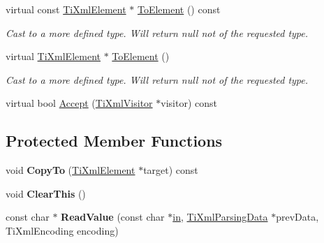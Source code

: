 \begin{DoxyCompactItemize}
\item 
\hypertarget{classTiXmlElement_ac5b8d0e25fa23fd9acbb6d146082901c}{virtual const \hyperlink{classTiXmlElement}{Ti\-Xml\-Element} $\ast$ \hyperlink{classTiXmlElement_ac5b8d0e25fa23fd9acbb6d146082901c}{To\-Element} () const }\label{classTiXmlElement_ac5b8d0e25fa23fd9acbb6d146082901c}

\begin{DoxyCompactList}\small\item\em Cast to a more defined type. Will return null not of the requested type. \end{DoxyCompactList}\item 
\hypertarget{classTiXmlElement_a9def86337ea7a755eb41cac980f60c7a}{virtual \hyperlink{classTiXmlElement}{Ti\-Xml\-Element} $\ast$ \hyperlink{classTiXmlElement_a9def86337ea7a755eb41cac980f60c7a}{To\-Element} ()}\label{classTiXmlElement_a9def86337ea7a755eb41cac980f60c7a}

\begin{DoxyCompactList}\small\item\em Cast to a more defined type. Will return null not of the requested type. \end{DoxyCompactList}\item 
virtual bool \hyperlink{classTiXmlElement_a31ab28cc3b892a69254391d6bbe08df3}{Accept} (\hyperlink{classTiXmlVisitor}{Ti\-Xml\-Visitor} $\ast$visitor) const 
\end{DoxyCompactItemize}
\subsection*{Protected Member Functions}
\begin{DoxyCompactItemize}
\item 
\hypertarget{classTiXmlElement_a9e0c1983b840de4134f1f6bf7af00b0f}{void {\bfseries Copy\-To} (\hyperlink{classTiXmlElement}{Ti\-Xml\-Element} $\ast$target) const }\label{classTiXmlElement_a9e0c1983b840de4134f1f6bf7af00b0f}

\item 
\hypertarget{classTiXmlElement_a5670933ec2d7d9763b9891acc05d7f7d}{void {\bfseries Clear\-This} ()}\label{classTiXmlElement_a5670933ec2d7d9763b9891acc05d7f7d}

\item 
\hypertarget{classTiXmlElement_ac786bce103042d3837c4cc2ff6967d41}{const char $\ast$ {\bfseries Read\-Value} (const char $\ast$\hyperlink{structin}{in}, \hyperlink{classTiXmlParsingData}{Ti\-Xml\-Parsing\-Data} $\ast$prev\-Data, Ti\-Xml\-Encoding encoding)}\label{classTiXmlElement_ac786bce103042d3837c4cc2ff6967d41}

\end{DoxyCompactItemize}
